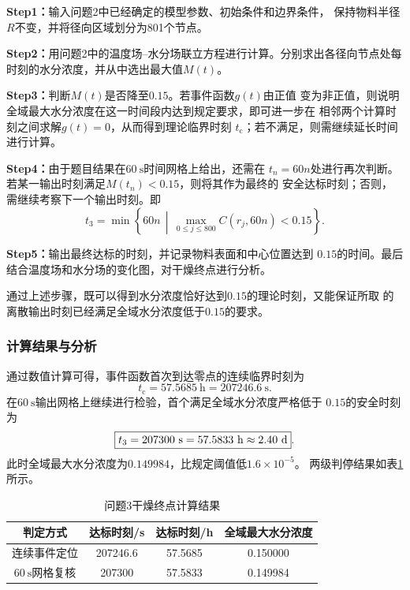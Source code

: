 \documentclass[12pt,a4paper,fontset=none]{ctexart}
\begin{document}
\noindent\textbf{Step1：}输入问题2中已经确定的模型参数、初始条件和边界条件，
保持物料半径$R$不变，并将径向区域划分为801个节点。

\noindent\textbf{Step2：}用问题2中的温度场--水分场联立方程进行计算。分别求出各径向节点处每时刻的水分浓度，并从中选出最大值$M(t)$。

\noindent\textbf{Step3：}判断$M(t)$是否降至$0.15$。若事件函数$g(t)$由正值
变为非正值，则说明全域最大水分浓度在这一时间段内达到规定要求，即可进一步在
相邻两个计算时刻之间求解$g(t)=0$，从而得到理论临界时刻
$t_{\mathrm{c}}$；若不满足，则需继续延长时间进行计算。

\noindent\textbf{Step4：}由于题目结果在$60\ \mathrm{s}$时间网格上给出，还需在
$t_n=60n$处进行再次判断。若某一输出时刻满足$M(t_n)<0.15$，则将其作为最终的
安全达标时刻；否则，需继续考察下一个输出时刻。即
\begin{equation}
t_3=\min\left\{60n\,\middle|\,
\max_{0\leq j\leq800}C(r_j,60n)<0.15\right\}.
\label{eq:q3_safe_time}
\end{equation}

\noindent\textbf{Step5：}输出最终达标的时刻，并记录物料表面和中心位置达到
$0.15$的时间。最后结合温度场和水分场的变化图，对干燥终点进行分析。

通过上述步骤，既可以得到水分浓度恰好达到$0.15$的理论时刻，又能保证所取
的离散输出时刻已经满足全域水分浓度低于$0.15$的要求。

\subsubsection{计算结果与分析}

通过数值计算可得，事件函数首次到达零点的连续临界时刻为
\begin{equation}
t_{\mathrm{c}}=57.5685\ \mathrm{h}
=207246.6\ \mathrm{s}.
\label{eq:q3_critical_result}
\end{equation}
在$60\ \mathrm{s}$输出网格上继续进行检验，首个满足全域水分浓度严格低于
$0.15$的安全时刻为
\begin{equation}
\boxed{t_3=207300\ \mathrm{s}
=57.5833\ \mathrm{h}
\approx2.40\ \mathrm{d}}.
\label{eq:q3_final_result}
\end{equation}
此时全域最大水分浓度为$0.149984$，比规定阈值低$1.6\times10^{-5}$。
两级判停结果如表\ref{tab:q3_results}所示。

\begin{table}[H]
\centering
\caption{问题3干燥终点计算结果}
\label{tab:q3_results}
\begin{tabular}{cccc}
\toprule
判定方式 & 达标时刻/s & 达标时刻/h & 全域最大水分浓度 \\
\midrule
连续事件定位 & 207246.6 & 57.5685 & 0.150000 \\
$60\ \mathrm{s}$网格复核 & 207300 & 57.5833 & 0.149984 \\
\bottomrule
\end{tabular}
\end{table}
\end{document}
